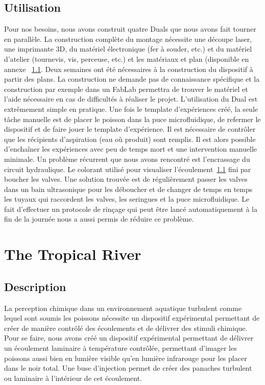   \subsection{Utilisation}
  Pour nos besoins, nous avons construit quatre Duals que nous avons fait tourner en parallèle. La construction complète du montage nécessite une découpe laser, une imprimante 3D, du matériel électronique (fer à souder, etc.) et du matériel d'atelier (tournevis, vis, perceuse, etc.) et les matériaux et plan (disponible en annexe ~\ref{}. Deux semaines ont été nécessaires à la construction du dispositif à partir des plans. La construction ne demande pas de connaissance spécifique et la construction par exemple dans un FabLab permettra de trouver le matériel et l'aide nécessaire en cas de difficultés à réaliser le projet.
  \medbreak
  L'utilisation du Dual est extrêmement simple en pratique. Une fois le template d'expériences créé, la seule tâche manuelle est de placer le poisson dans la puce microfluidique, de refermer le dispositif et de faire jouer le template d'expérience. Il est nécessaire de contrôler que les récipients d'aspiration (eau où produit) sont remplis. Il est alors possible d'enchaîner les expériences avec peu de temps mort et une intervention manuelle minimale.
  \medbreak
  Un problème récurrent que nous avons rencontré est l'encrassage du circuit hydraulique. Le colorant utilisé pour visualiser l'écoulement~\ref{} fini par boucher les valves. Une solution trouvée est de régulièrement passer les valves dans un bain ultrasonique pour les déboucher et de changer de temps en temps les tuyaux qui raccordent les valves, les seringues et la puce microfluidique. Le fait d'effectuer un protocole de rinçage qui peut être lancé automatiquement à la fin de la journée nous a aussi permis de réduire ce problème. 

  \section{The Tropical River}
  \subsection{Description}
  La perception chimique dans un environnement aquatique turbulent comme lequel sont soumis les poissons nécessite un dispositif expérimental permettant de créer de manière contrôlé des écoulements et de délivrer des stimuli chimique. Pour se faire, nous avons créé un dispositif expérimental permettant de délivrer un écoulement laminaire à température contrôlée, permettant d'imager les poissons aussi bien en lumière visible qu'en lumière infrarouge pour les placer dans le noir total. Une buse d'injection permet de créer des panaches turbulent ou laminaire à l'intérieur de cet écoulement.
